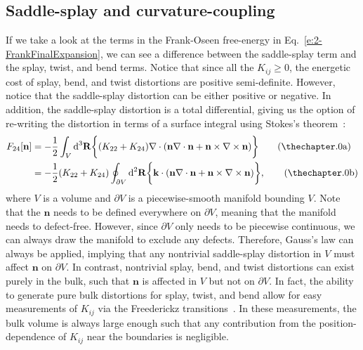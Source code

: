 \subsection{Saddle-splay and curvature-coupling}
If we take a look at the terms in the Frank-Oseen free-energy in Eq.~\ref{e:2-FrankFinalExpansion}, we can see a difference between the saddle-splay term and the splay, twist, and bend terms.
Notice that since all the $K_{ij} \geq 0$, the energetic cost of splay, bend, and twist distortions are positive semi-definite.
However, notice that the saddle-splay distortion can be either positive or negative.
In addition, the saddle-splay distortion is a total differential, giving us the option of re-writing the distortion in terms of a surface integral using Stokes's theorem~\cite{RN230}:
\label{e:2-F24Gauss}
\begin{align}
  F_{24}[\mathbf{n}] &= - \frac{1}{2}\int_{V} \textup{d}^3  \mathbf{R} \bigg \{ (K_{22} + K_{24})  \nabla \cdot (\mathbf{n}\nabla \cdot \mathbf{n} + \mathbf{n} \times \nabla \times \mathbf{n}) \bigg \}\tag{\theequation a}  \\ &=
  - \frac{1}{2}(K_{22} + K_{24}) \oint_{\partial V} \textup{d}^2  \mathbf{R} \bigg \{   \mathbf{k} \cdot (\mathbf{n}\nabla \cdot \mathbf{n} + \mathbf{n} \times \nabla \times \mathbf{n}) \bigg \},\tag{\theequation b}
\end{align}
where $V$ is a volume and $\partial V$ is a piecewise-smooth manifold bounding $V$.
Note that the $\mathbf{n}$ needs to be defined everywhere on $\partial V$, meaning that the manifold needs to defect-free.
However, since $\partial V$ only needs to be piecewise continuous, we can always draw the manifold to exclude any defects.
Therefore, Gauss's law can always be applied, implying that any nontrivial saddle-splay distortion in $V$ must affect $\mathbf{n}$ on $\partial V$.
In contrast, nontrivial splay, bend, and twist distortions can exist purely in the bulk, such that $\mathbf{n}$ is affected in $V$ but not on $\partial V$.
In fact, the ability to generate pure bulk distortions for splay, twist, and bend allow for easy measurements of $K_{ij}$ via the Freederickz transitions~\cite{RN212,RN213,RN33,RN188,RN182,RN183}.
In these measurements, the bulk volume is always large enough such that any contribution from the position-dependence of $K_{ij}$ near the boundaries is negligible. \\

